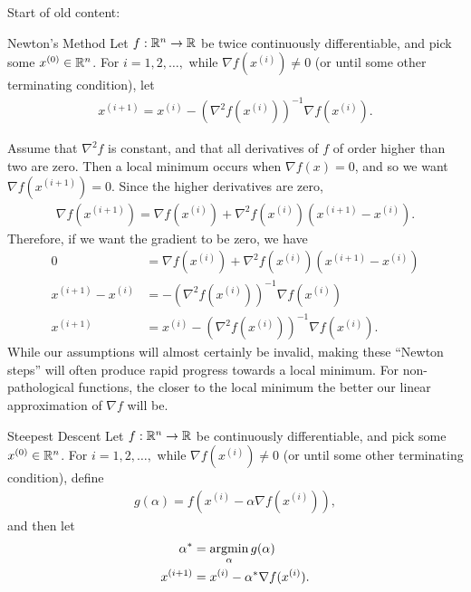 \vspace{2cm}
{\color{Fuchsia}\Huge Start of old content:}

\begin{defn}{Newton's Method}\label{newtons-method}\proofbreak
    Let $f: \mathbb{R}^n \to \mathbb{R}$ be twice continuously differentiable, and pick some $x^{(0)} \in \mathbb{R}^n$. For $i = 1, 2, \ldots, $ while $\nabla f(x^{(i)}) \neq 0$ (or until some other terminating condition), let
    \begin{align*}
        x^{(i+1)} = x^{(i)} - \left(\nabla^2f(x^{(i)})\right)^{-1}\nabla f(x^{(i)}).
    \end{align*}
\end{defn}

\begin{rmk}
    Assume that $\nabla^2f$ is constant, and that all derivatives of $f$ of order higher than two are zero. Then a local minimum occurs when $\nabla f(x) = 0$, and so we want $\nabla f(x^{(i+1)}) = 0$. Since the higher derivatives are zero,
    \begin{align*}
        \nabla f(x^{(i+1)}) = \nabla f(x^{(i)}) + \nabla^2f(x^{(i)})(x^{(i+1)} - x^{(i)}).
    \end{align*}
    Therefore, if we want the gradient to be zero, we have
    \begin{align*}
        0 &= \nabla f(x^{(i)}) + \nabla^2f(x^{(i)})(x^{(i+1)} - x^{(i)}) \\
        x^{(i+1)} - x^{(i)} &= -\left(\nabla^2f(x^{(i)})\right)^{-1}\nabla f(x^{(i)}) \\
        x^{(i+1)} &= x^{(i)} - \left(\nabla^2f(x^{(i)})\right)^{-1}\nabla f(x^{(i)}).
    \end{align*}
    While our assumptions will almost certainly be invalid, making these ``Newton steps'' will often produce rapid progress towards a local minimum. For non-pathological functions, the closer to the local minimum the better our linear approximation of $\nabla f$ will be.
\end{rmk}

\begin{defn}{Steepest Descent}\label{steepest-method}\proofbreak
    Let $f: \mathbb{R}^n \to \mathbb{R}$ be continuously differentiable, and pick some $x^{(0)} \in \mathbb{R}^n$.
    For $i = 1, 2, \ldots, $ while $\nabla f(x^{(i)}) \neq 0$ (or until some other terminating condition), define
    \begin{align*}
        g(\alpha) = f(x^{(i)} - \alpha\nabla f(x^{(i)})),
    \end{align*}
    and then let
    \begin{align*}
        \alpha^* &= \operatorname*{argmin}_{\alpha}g(\alpha) \\
        x^{(i+1)} &= x^{(i)} - \alpha^{*}\nabla f(x^{(i)}).
    \end{align*}
\end{defn}

